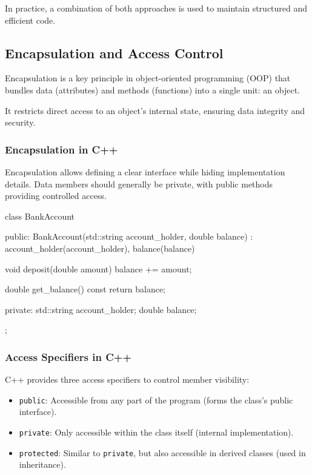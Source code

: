 In practice, a combination of both approaches is used to maintain structured and efficient code.


\subsection{Encapsulation and Access Control}

Encapsulation is a key principle in object-oriented programming (OOP) that bundles data (attributes) and methods (functions) into a single unit: an object.

It restricts direct access to an object's internal state, ensuring data integrity and security.

\subsubsection{Encapsulation in C++}

Encapsulation allows defining a clear interface while hiding implementation details. Data members should generally be private, with public methods providing controlled access.

\begin{exampleblock}
\begin{codeblock}[language=C++, numbers=none]
class BankAccount {
public:
    BankAccount(std::string account_holder, double balance)
        : account_holder(account_holder), balance(balance) {}

    void deposit(double amount) {
        balance += amount;
    }

    double get_balance() const {
        return balance;
    }

private:
    std::string account_holder;
    double balance;
};
\end{codeblock}
\end{exampleblock}

\subsubsection{Access Specifiers in C++}

C++ provides three access specifiers to control member visibility:

\begin{itemize}
    \item \texttt{public}: Accessible from any part of the program (forms the class's public interface).
    \item \texttt{private}: Only accessible within the class itself (internal implementation).
    \item \texttt{protected}: Similar to \texttt{private}, but also accessible in derived classes (used in inheritance).
\end{itemize}

